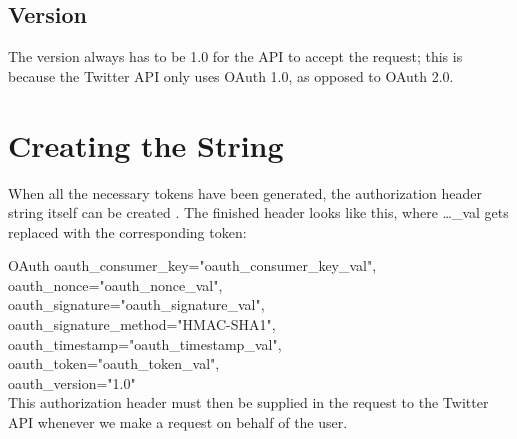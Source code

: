 
\subsection*{Version}
The version always has to be 1.0 for the API to accept the request; this is
because the Twitter \ac{API} only uses OAuth 1.0, as opposed to OAuth 2.0.

\section{Creating the String}\label{label:stringCreate}
When all the necessary tokens have been generated, the authorization header
string itself can be created \citep{TwitterAPIAuth}. The finished header looks like this, where
\ldots\_val gets replaced with the corresponding token:\nl

OAuth oauth\_consumer\_key="oauth\_consumer\_key\_val",\\
oauth\_nonce="oauth\_nonce\_val", \\
oauth\_signature="oauth\_signature\_val", \\
oauth\_signature\_method="HMAC-SHA1", \\
oauth\_timestamp="oauth\_timestamp\_val", \\
oauth\_token="oauth\_token\_val", \\
oauth\_version="1.0" \\

This authorization header must then be supplied in the request to the Twitter
API whenever we make a request on behalf of the user.
